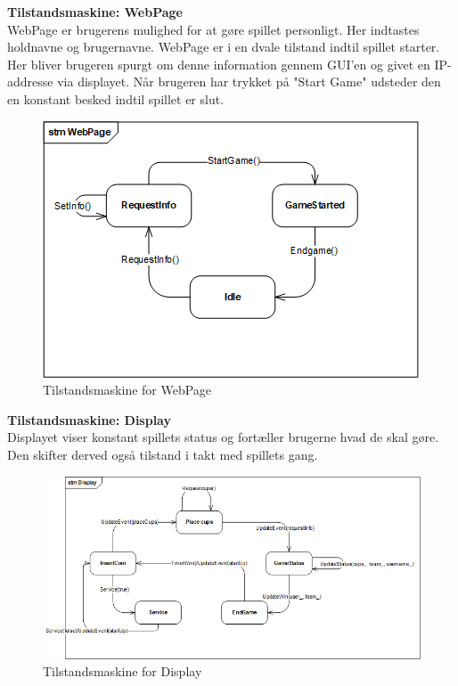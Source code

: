 \documentclass[Arkitektur/System_main.tex]{subfiles}
\begin{document}
\textbf{Tilstandsmaskine: WebPage}\\
WebPage er brugerens mulighed for at gøre spillet personligt. Her indtastes holdnavne og brugernavne. WebPage er i en dvale tilstand indtil spillet starter. Her bliver brugeren spurgt om denne information gennem GUI'en og givet en IP-addresse via displayet. Når brugeren har trykket på "Start Game" udsteder den en konstant besked indtil spillet er slut. 

\begin{figure}[H]
    \centering
    \includegraphics[width=\textwidth]{Arkitektur/Softwarearkitektur/Applikationsmodel/RPi/graphics_RPi/stm_web.png}
    \caption{Tilstandsmaskine for WebPage}
    \label{fig:stm_Web}
\end{figure}

\textbf{Tilstandsmaskine: Display}\\
Displayet viser konstant spillets status og fortæller brugerne hvad de skal gøre. Den skifter derved også tilstand i takt med spillets gang. 

\begin{figure}[H]
    \centering
    \includegraphics[width=\textwidth]{Arkitektur/Softwarearkitektur/Applikationsmodel/RPi/graphics_RPi/stm_disp.png}
    \caption{Tilstandsmaskine for Display}
    \label{fig:stm_disp}
\end{figure}
\end{document}
